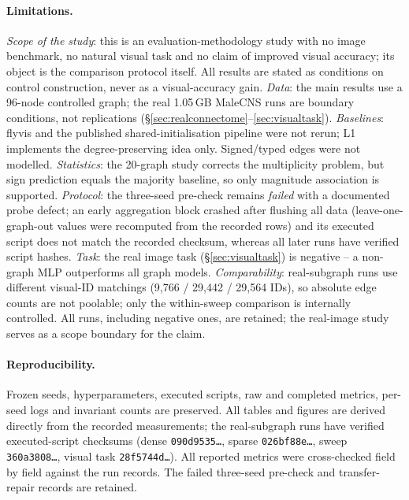 \documentclass[10pt,twocolumn,letterpaper]{article}
\begin{document}
\paragraph{Limitations.}
\emph{Scope of the study}: this is an evaluation-methodology study with no
image benchmark, no natural visual task and no claim of improved visual
accuracy; its object is the comparison protocol itself. All results are
stated as conditions on control construction, never as a visual-accuracy gain.
\emph{Data}: the main results use a 96-node controlled graph; the real
1.05\,GB MaleCNS runs are boundary conditions, not replications
(\S\ref{sec:realconnectome}--\ref{sec:visualtask}). \emph{Baselines}: flyvis
and the published shared-initialisation pipeline were not rerun; L1 implements
the degree-preserving idea only. Signed/typed edges were not modelled.
\emph{Statistics}: the 20-graph study corrects the multiplicity problem, but
sign prediction equals the majority baseline, so only magnitude association is
supported. \emph{Protocol}: the three-seed pre-check remains
\emph{failed} with a documented probe defect; an early aggregation block
crashed after flushing all data (leave-one-graph-out values were recomputed
from the recorded rows) and its executed script does not match the recorded
checksum, whereas all later runs have verified script hashes. \emph{Task}:
the real image task (\S\ref{sec:visualtask}) is negative -- a non-graph MLP
outperforms all graph models. \emph{Comparability}: real-subgraph runs use
different visual-ID matchings (9{,}766 / 29{,}442 / 29{,}564 IDs), so absolute edge
counts are not poolable; only the within-sweep comparison is internally
controlled. All runs, including negative ones, are retained; the real-image
study serves as a scope boundary for the claim.

\paragraph{Reproducibility.}
Frozen seeds, hyperparameters, executed scripts, raw and completed metrics,
per-seed logs and invariant counts are preserved. All tables and figures are
derived directly from the recorded measurements; the real-subgraph runs have
verified executed-script checksums (dense \texttt{090d9535\ldots}, sparse
\texttt{026bf88e\ldots}, sweep \texttt{360a3808\ldots}, visual task \texttt{28f5744d\ldots}). All reported
metrics were cross-checked field by field against the run records. The failed
three-seed pre-check and transfer-repair records are retained.
\end{document}
